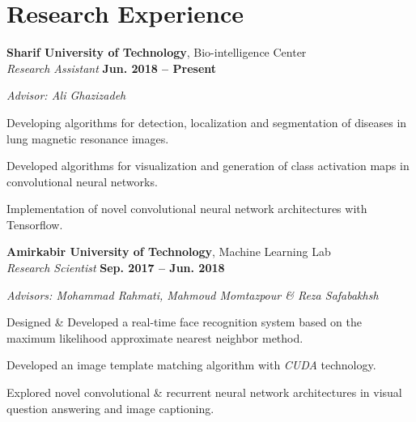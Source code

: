 \section{\sc Research Experience}
{\bf Sharif University of Technology}, Bio-intelligence Center \\ 
\vspace{0.1cm}
\textit{Research Assistant} \hfill{\textbf{Jun. 2018 -- Present}} \\
\vspace{-0.4cm}
\begin{list2}
	\item \textit{Advisor: Ali Ghazizadeh}
	\item Developing algorithms for detection, localization and segmentation of diseases in lung magnetic resonance images.
	\item Developed algorithms for visualization and generation of class activation maps in convolutional neural networks.
	\item Implementation of novel convolutional neural network architectures with Tensorflow.
\end{list2}

{\bf Amirkabir University of Technology}, Machine Learning Lab \\ 
\vspace{0.1cm}
\textit{Research Scientist} \hfill{\textbf{Sep. 2017 -- Jun. 2018}} \\
\vspace{-0.4cm}
\begin{list2}
	\item \textit{Advisors: Mohammad Rahmati, Mahmoud Momtazpour \& Reza Safabakhsh}
	\item Designed \& Developed a real-time face recognition system based on the maximum likelihood approximate nearest neighbor method.
	
	\item Developed an image template matching algorithm with \textit{CUDA} technology.
	
	\item Explored novel convolutional \& recurrent neural network architectures in visual question answering and image captioning.
\end{list2}
\endinput